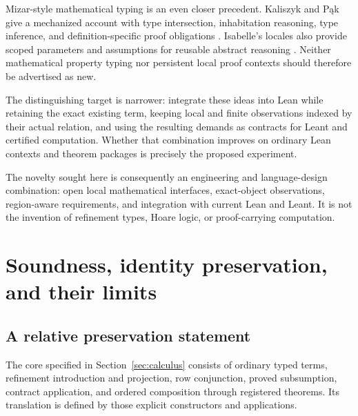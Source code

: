 \documentclass[11pt,a4paper]{article}
\theoremstyle{definition}
\begin{document}
Mizar-style mathematical typing is an even closer precedent. Kaliszyk and
P\k{a}k give a mechanized account with type intersection, inhabitation reasoning,
type inference, and definition-specific proof obligations \cite{mizarsem}.
Isabelle's locales also provide scoped parameters and assumptions for reusable
abstract reasoning \cite{locales}. Neither mathematical property typing nor
persistent local proof contexts should therefore be advertised as new.

The distinguishing target is narrower: integrate these ideas into Lean while
retaining the exact existing term, keeping local and finite observations indexed
by their actual relation, and using the resulting demands as contracts for
Leant and certified computation. Whether that combination improves on ordinary
Lean contexts and theorem packages is precisely the proposed experiment.

The novelty sought here is consequently an engineering and language-design
combination: open local mathematical interfaces, exact-object observations,
region-aware requirements, and integration with current Lean and Leant. It is
not the invention of refinement types, Hoare logic, or proof-carrying computation.

\section{Soundness, identity preservation, and their limits}\label{sec:metatheory}
\subsection{A relative preservation statement}
The core specified in Section~\ref{sec:calculus} consists of ordinary typed
terms, refinement introduction and projection, row conjunction, proved
subsumption, contract application, and ordered composition through registered
theorems. Its translation is defined by those explicit constructors and
applications.
\end{document}
